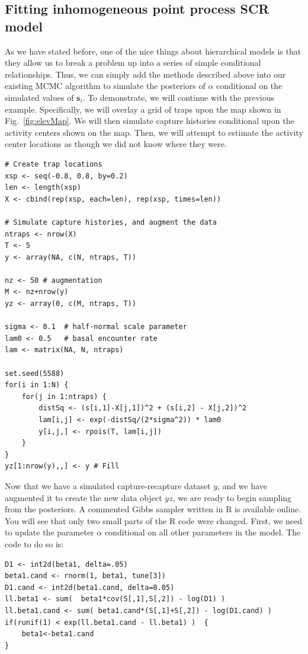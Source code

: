 \documentclass{book}
\begin{document}
\subsection{Fitting inhomogeneous point process SCR model}

As we have stated before, one
of the nice things about hierarchical models is that they allow us to
break a problem up into a series of simple conditional
relationships. Thus,
we can simply add the methods described above into our existing MCMC
algorithm to simulate the posteriors of $\alpha$ conditional on the
simulated values of $\mathbf{s}_i$. To demonstrate, we will continue with
the previous example. Specifically, we will overlay a grid of
traps upon the map shown in Fig.~\ref{fig:elevMap}. We will then
simulate capture histories conditional upon the activity centers shown
on the map. Then, we will attempt to estimate the activity center
locations as though we did not know where they were.

\begin{small}
\begin{verbatim}
# Create trap locations
xsp <- seq(-0.8, 0.8, by=0.2)
len <- length(xsp)
X <- cbind(rep(xsp, each=len), rep(xsp, times=len))

# Simulate capture histories, and augment the data
ntraps <- nrow(X)
T <- 5
y <- array(NA, c(N, ntraps, T))

nz <- 50 # augmentation
M <- nz+nrow(y)
yz <- array(0, c(M, ntraps, T))

sigma <- 0.1  # half-normal scale parameter
lam0 <- 0.5   # basal encounter rate
lam <- matrix(NA, N, ntraps)

set.seed(5588)
for(i in 1:N) {
    for(j in 1:ntraps) {
        distSq <- (s[i,1]-X[j,1])^2 + (s[i,2] - X[j,2])^2
        lam[i,j] <- exp(-distSq/(2*sigma^2)) * lam0
        y[i,j,] <- rpois(T, lam[i,j])
    }
}
yz[1:nrow(y),,] <- y # Fill
\end{verbatim}
\end{small}

Now that we have a simulated capture-recapture dataset $y$, and we have
augmented it to create the new data object $yz$, we are ready to
begin sampling from the posteriors. A commented Gibbs sampler written in R is
available online. You will see that only two small parts of the R code
were changed. First, we need to update the parameter $\alpha$
conditional on all other parameters in the model. The code to do so is:

\begin{small}
\begin{verbatim}
D1 <- int2d(beta1, delta=.05)
beta1.cand <- rnorm(1, beta1, tune[3])
D1.cand <- int2d(beta1.cand, delta=0.05)
ll.beta1 <- sum(  beta1*cov(S[,1],S[,2]) - log(D1) )
ll.beta1.cand <- sum( beta1.cand*(S[,1]+S[,2]) - log(D1.cand) )
if(runif(1) < exp(ll.beta1.cand - ll.beta1) )  {
    beta1<-beta1.cand
}
\end{verbatim}
\end{small}
\end{document}
